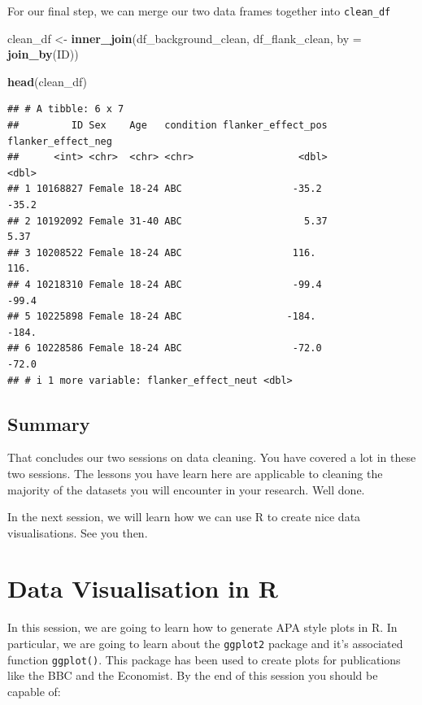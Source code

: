 \documentclass[
]{book}
\newenvironment{Shaded}{\begin{snugshade}}{\end{snugshade}}
\newcommand{\AttributeTok}[1]{\textcolor[rgb]{0.13,0.29,0.53}{#1}}
\newcommand{\FunctionTok}[1]{\textcolor[rgb]{0.13,0.29,0.53}{\textbf{#1}}}
\newcommand{\NormalTok}[1]{#1}
\newcommand{\OtherTok}[1]{\textcolor[rgb]{0.56,0.35,0.01}{#1}}
\begin{document}
For our final step, we can merge our two data frames together into \texttt{clean\_df}

\begin{Shaded}
\begin{Highlighting}[]
\NormalTok{clean\_df }\OtherTok{\textless{}{-}} \FunctionTok{inner\_join}\NormalTok{(df\_background\_clean, df\_flank\_clean, }\AttributeTok{by =} \FunctionTok{join\_by}\NormalTok{(ID))}

\FunctionTok{head}\NormalTok{(clean\_df)}
\end{Highlighting}
\end{Shaded}

\begin{verbatim}
## # A tibble: 6 x 7
##         ID Sex    Age   condition flanker_effect_pos flanker_effect_neg
##      <int> <chr>  <chr> <chr>                  <dbl>              <dbl>
## 1 10168827 Female 18-24 ABC                   -35.2              -35.2 
## 2 10192092 Female 31-40 ABC                     5.37               5.37
## 3 10208522 Female 18-24 ABC                   116.               116.  
## 4 10218310 Female 18-24 ABC                   -99.4              -99.4 
## 5 10225898 Female 18-24 ABC                  -184.              -184.  
## 6 10228586 Female 18-24 ABC                   -72.0              -72.0 
## # i 1 more variable: flanker_effect_neut <dbl>
\end{verbatim}

\hypertarget{summary-8}{%
\section{Summary}\label{summary-8}}

That concludes our two sessions on data cleaning. You have covered a lot in these two sessions. The lessons you have learn here are applicable to cleaning the majority of the datasets you will encounter in your research. Well done.

In the next session, we will learn how we can use R to create nice data visualisations. See you then.

\hypertarget{data-vis}{%
\chapter{Data Visualisation in R}\label{data-vis}}

In this session, we are going to learn how to generate APA style plots in R. In particular, we are going to learn about the \texttt{ggplot2} package and it's associated function \texttt{ggplot()}. This package has been used to create plots for publications like the BBC and the Economist. By the end of this session you should be capable of:
\end{document}

